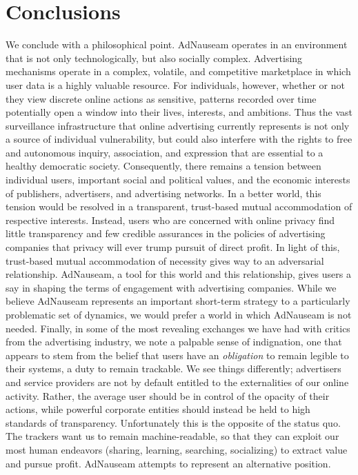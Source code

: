 \documentclass[conference]{IEEEtran}
\begin{document}
\section{Conclusions}

We conclude with a philosophical point. AdNauseam operates in an environment that is not only technologically, but also socially complex. Advertising mechanisms operate in a complex, volatile, and competitive marketplace in which user data is a highly valuable resource. For individuals, however, whether or not they view discrete online actions as sensitive, patterns recorded over time potentially open a window into their lives, interests, and ambitions. Thus the vast surveillance infrastructure that online advertising currently represents is not only a source of individual vulnerability, but could also interfere with the rights to free and autonomous inquiry, association, and expression that are essential to a healthy democratic society. Consequently, there remains a tension between individual users, important social and political values, and the economic interests of publishers, advertisers, and advertising networks. In a better world, this tension would be resolved in a transparent, trust-based mutual accommodation of respective interests. Instead, users who are concerned with online privacy find little transparency and few credible assurances in the policies of advertising companies that privacy will ever trump pursuit of direct profit. In light of this, trust-based mutual accommodation of necessity gives way to an adversarial relationship. AdNauseam, a tool for this world and this relationship, gives users a say in shaping the terms of engagement with advertising companies. While we believe AdNauseam represents an important short-term strategy to a particularly problematic set of dynamics, we would prefer a world in which AdNauseam is not needed.
Finally, in some of the most revealing exchanges we have had with critics from the advertising industry, we note a palpable sense of indignation, one that appears to stem from the belief that users have an \emph{obligation} to remain legible to their systems, a duty to remain trackable. We see things differently; advertisers and service providers are not by default entitled to the externalities of our online activity. Rather, the average user should be in control of the opacity of their actions, while powerful corporate entities should instead be held to high standards of transparency. Unfortunately this is the opposite of the status quo. The trackers want us to remain machine-readable, so that they can exploit our most human endeavors (sharing, learning, searching, socializing) to extract value and pursue profit. AdNauseam attempts to represent an alternative position.
\end{document}
